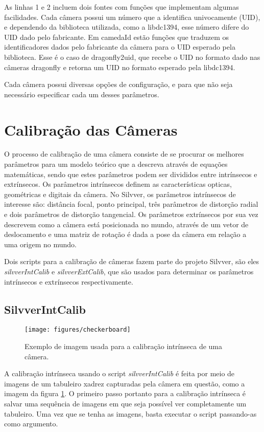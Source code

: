 \documentclass[a4paper,10pt]{article}
\begin{document}
As linhas 1 e 2 incluem dois fontes com funções que implementam algumas
facilidades. Cada câmera possui um número que a identifica univocamente (UID),
e dependendo da biblioteca utilizada, como a libdc1394, esse número difere do
UID dado pelo fabricante. Em camedaId estão funções que traduzem os
identificadores dados pelo fabricante da câmera para o UID esperado pela
biblioteca. Esse é o caso de dragonfly2uid, que recebe o UID no formato dado
nas câmeras dragonfly e retorna um UID no formato esperado pela libdc1394.

Cada câmera possui diversas opções de configuração, e para que não seja
necessário especificar cada um desses parâmetros.

\section{Calibração das Câmeras}

O processo de calibração de uma câmera consiste de se procurar os melhores
parâmetros para um modelo teórico que a descreva através de equações
matemáticas, sendo que estes parâmetros podem ser divididos entre intrínsecos
e extrínsecos. Os parâmetros intrínsecos definem as características opticas,
geométricas e digitais da câmera. No Silvver, os parâmetros intrínsecos de
interesse são: distância focal, ponto principal, três parâmetros de distorção
radial e dois parâmetros de distorção tangencial. Os parâmetros extrínsecos
por sua vez descrevem como a câmera está posicionada no mundo, através de um
vetor de deslocamento e uma matriz de rotação é dada a pose da câmera em
relação a uma origem no mundo.

Dois scripts para a calibração de câmeras fazem parte do projeto Silvver, são
eles \emph{silvverIntCalib} e \emph{silvverExtCalib}, que são usados para
determinar os parâmetros intrínsecos e extrínsecos respectivamente.

\subsection{SilvverIntCalib}

\begin{figure}
  \centering
  \texttt{[image: figures/checkerboard]}
  \caption{Exemplo de imagem usada para a calibração intrínseca de uma
    câmera.}
  \label{fig:checkerboard}
\end{figure}

A calibração intrínseca usando o script \emph{silvverIntCalib} é feita por
meio de imagens de um tabuleiro xadrez capturadas pela câmera em questão, como
a imagem da figura \ref{fig:checkerboard}. O primeiro passo portanto para a
calibração intrínseca é salvar uma sequência de imagens em que seja possível
ver completamente um tabuleiro. Uma vez que se tenha as imagens, basta
executar o script passando-as como argumento.
\end{document}
